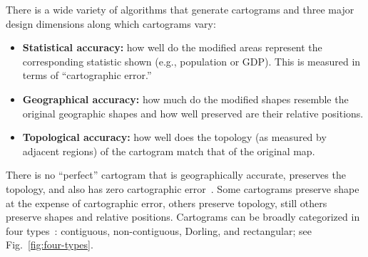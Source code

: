 \documentclass[10pt,journal,compsoc]{IEEEtran}
\begin{document}
\begin{comment}
There is a wide variety of algorithms that generate cartograms. There are three major design dimensions along which cartograms may vary: 
\begin{itemize}
\item Minimizing cartographic error: cartographic error represents how well do the modified areas represent the corresponding statistic shown (e.g., population or GDP).

\item Shape and relative position preservation: how much the modified shapes and locations of the 
regions (countries and states) resemble the originals.

\item Topology preservation: how well the topology of the original map is preserved as measured by adjacent regions and the relative locations of the regions.
\end{itemize}

There is no ``perfect'' cartogram that preserves shapes, preserves the topology, and also has zero cartographic error~\cite{AKV15}. Some cartograms preserve shape at the expense of cartographic error, others preserve topology, still others preserve shapes and relative positions. Cartograms can be broadly categorized in four types~\cite{ks07}: \textbf{contiguous, non-contiguous, Dorling, rectangular}.
\end{comment}


There is a wide variety of algorithms that generate cartograms and three major design dimensions along which cartograms vary: 
\begin{itemize}
\item \textbf{Statistical accuracy:} how well do the modified areas represent the corresponding statistic shown (e.g., population or GDP). This is measured in terms of ``cartographic error.''

\item \textbf{Geographical accuracy:} how much do the modified shapes resemble the original geographic shapes and how well preserved are their relative positions.

\item \textbf{Topological accuracy:} how well does the topology (as measured by adjacent regions) of the cartogram match that of the original map.
\end{itemize}

There is no ``perfect'' cartogram that is geographically accurate, preserves the topology, and also has zero cartographic error~\cite{AKV15}. Some cartograms preserve shape at the expense of cartographic error, others preserve topology, still others preserve shapes and relative positions. Cartograms can be broadly categorized in four types~\cite{ks07}: contiguous, non-contiguous, Dorling, and rectangular; see Fig.~\ref{fig:four-types}.
\end{document}
